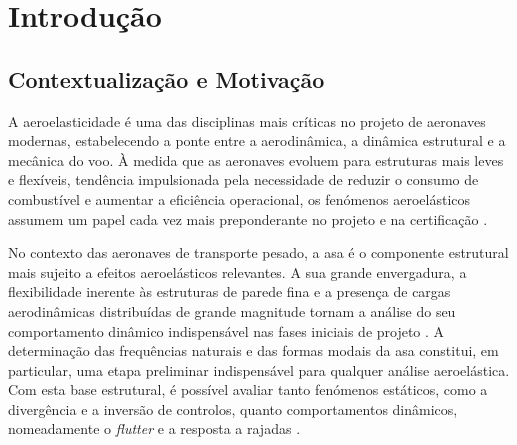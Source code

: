 \documentclass[11pt,oneside,a4paper,final]{report}
\begin{document}

\MakeCover


\tableofcontents

\listoffigures
\listoftables

\newpage


\chapter{Introdução}
\label{chap:introducao}

\section{Contextualização e Motivação}

A aeroelasticidade é uma das disciplinas mais críticas no projeto de aeronaves modernas, estabelecendo a ponte entre a aerodinâmica, a dinâmica estrutural e a mecânica do voo. À medida que as aeronaves evoluem para estruturas mais leves e flexíveis, tendência impulsionada pela necessidade de reduzir o consumo de combustível e aumentar a eficiência operacional, os fenómenos aeroelásticos assumem um papel cada vez mais preponderante no projeto e na certificação \cite{Wright2015, Dowell2004}.

No contexto das aeronaves de transporte pesado, a asa é o componente estrutural mais sujeito a efeitos aeroelásticos relevantes. A sua grande envergadura, a flexibilidade inerente às estruturas de parede fina e a presença de cargas aerodinâmicas distribuídas de grande magnitude tornam a análise do seu comportamento dinâmico indispensável nas fases iniciais de projeto \cite{Megson2012, Bisplinghoff1996}. A determinação das frequências naturais e das formas modais da asa constitui, em particular, uma etapa preliminar indispensável para qualquer análise aeroelástica. Com esta base estrutural, é possível avaliar tanto fenómenos estáticos, como a divergência e a inversão de controlos, quanto comportamentos dinâmicos, nomeadamente o \textit{flutter} e a resposta a rajadas \cite{Collar1946, Fung1993}.
\end{document}
